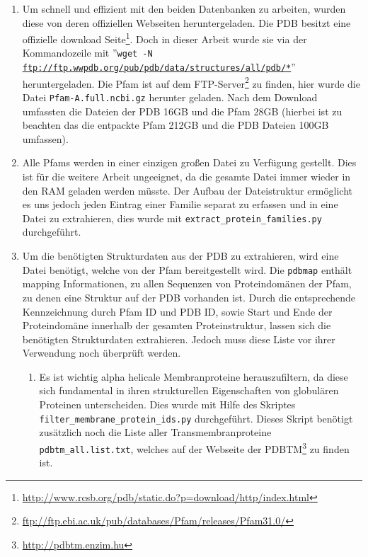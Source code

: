 \begin{enumerate}
\item
    \begin{sloppypar}
    Um schnell und effizient mit den beiden Datenbanken zu arbeiten, wurden diese von deren offiziellen Webseiten heruntergeladen. Die \ac{PDB} besitzt eine offizielle download Seite\footnote{\url{http://www.rcsb.org/pdb/static.do?p=download/http/index.html}}. Doch in dieser Arbeit wurde sie via der Kommandozeile mit ''\texttt{wget -N \url{ftp://ftp.wwpdb.org/pub/pdb/data/structures/all/pdb/*}}'' heruntergeladen. Die \ac{Pfam} ist auf dem FTP-Server\footnote{\url{ftp://ftp.ebi.ac.uk/pub/databases/Pfam/releases/Pfam31.0/}} zu finden, hier wurde die Datei \texttt{Pfam-A.full.ncbi.gz} herunter geladen. Nach dem Download umfassten die Dateien der \ac{PDB} 16GB und die \ac{Pfam} 28GB (hierbei ist zu beachten das die entpackte \ac{Pfam} 212GB und die \ac{PDB} Dateien 100GB umfassen).
    \end{sloppypar}
\item
    Alle \ac{Pfams} werden in einer einzigen großen Datei zu Verfügung gestellt. Dies ist für die weitere Arbeit ungeeignet, da die gesamte Datei immer wieder in den \ac{RAM} geladen werden müsste. Der Aufbau der Dateistruktur ermöglicht es uns jedoch jeden Eintrag einer Familie separat zu erfassen und in eine Datei zu extrahieren, dies wurde mit \texttt{extract\_protein\_families.py} durchgeführt.
\item
    Um die benötigten Strukturdaten aus der PDB zu extrahieren, wird eine Datei benötigt, welche von der Pfam bereitgestellt wird. Die \texttt{pdbmap} enthält mapping Informationen, zu allen Sequenzen von Proteindomänen der \ac{Pfam}, zu denen eine Struktur auf der \ac{PDB} vorhanden ist. Durch die entsprechende Kennzeichnung durch \ac{Pfam} ID und \ac{PDB} ID, sowie Start und Ende der Proteindomäne innerhalb der gesamten Proteinstruktur, lassen sich die benötigten Strukturdaten extrahieren. Jedoch muss diese Liste vor ihrer Verwendung noch überprüft werden.
    \begin{enumerate}
        \item 
        Es ist wichtig alpha helicale Membranproteine herauszufiltern, da diese sich fundamental in ihren strukturellen Eigenschaften von globulären Proteinen unterscheiden. Dies wurde mit Hilfe des Skriptes \texttt{filter\_membrane\_protein\_ids.py} durchgeführt. Dieses Skript benötigt zusätzlich noch die Liste aller Transmembranproteine \texttt{pdbtm\_all.list.txt}, welches auf der Webseite der \ac{PDBTM}\footnote{\url{http://pdbtm.enzim.hu}} zu finden ist.

\end{enumerate}
\end{enumerate}
